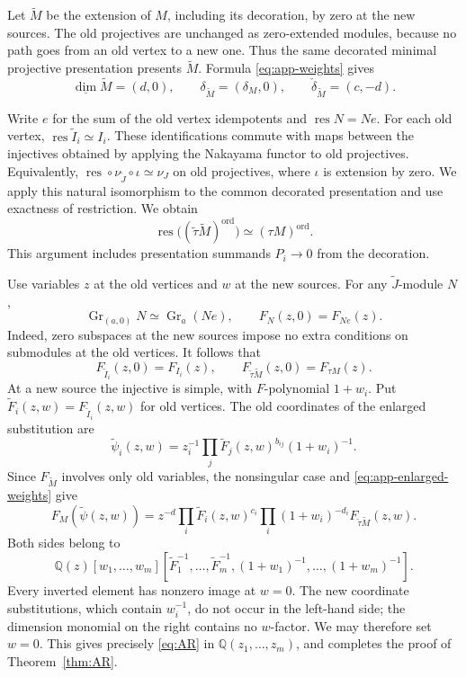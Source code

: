 \documentclass[11pt]{amsart}
\numberwithin{equation}{section}
\theoremstyle{definition}
\theoremstyle{remark}
\newcommand{\op}[1]{\operatorname{#1}}
\newcommand{\Gr}{\op{Gr}}
\newcommand{\QQ}{\mathbb Q}
\newcommand{\dv}{\underline{\dim}}
\newcommand{\res}{\op{res}}
\begin{document}
Let $\widetilde M$ be the extension of $M$, including its
decoration, by zero at the new sources. The old projectives are
unchanged as zero-extended modules, because no path goes from an old
vertex to a new one. Thus the same decorated minimal projective
presentation presents $\widetilde M$. Formula
\eqref{eq:app-weights} gives
\begin{equation}\label{eq:app-enlarged-weights} \dv\widetilde M=(d,0),\qquad \delta_{\widetilde M}=(\delta_M,0),\qquad \check\delta_{\widetilde M}=(c,-d).\end{equation}

Write $e$ for the sum of the old vertex idempotents and
$\res N=Ne$. For each old vertex,
$\res\widetilde I_i\simeq I_i$.
These identifications commute with maps between the injectives obtained
by applying the Nakayama functor to old projectives. Equivalently,
$\res\circ\nu_{\widetilde J}\circ\iota\simeq\nu_J$ on old
projectives, where $\iota$ is extension by zero. We apply this
natural isomorphism to the common decorated presentation and use
exactness of restriction. We obtain
\[ \res\bigl((\widetilde\tau\widetilde M)^{\mathrm{ord}}\bigr)\simeq(\tau M)^{\mathrm{ord}}. \]
This argument includes presentation summands $P_i\to0$ from the decoration.

Use variables $z$ at the old vertices and $w$ at the new sources.
For any $\widetilde J$-module $N$,
\[ \Gr_{(a,0)}N\simeq\Gr_a(Ne),\qquad F_N(z,0)=F_{Ne}(z). \]
Indeed, zero subspaces at the new sources impose no extra conditions
on submodules at the old vertices. It follows that
\[ F_{\widetilde I_i}(z,0)=F_{I_i}(z),\qquad F_{\widetilde\tau\widetilde M}(z,0)=F_{\tau M}(z). \]
At a new source the injective is simple, with $F$-polynomial
$1+w_i$. Put $\widetilde F_i(z,w)=F_{\widetilde I_i}(z,w)$ for old
vertices. The old coordinates of the enlarged substitution are
\[ \widetilde\psi_i(z,w) =z_i^{-1}\prod_j\widetilde F_j(z,w)^{b_{ij}}(1+w_i)^{-1}. \]
Since $F_{\widetilde M}$ involves only old variables, the
nonsingular case and \eqref{eq:app-enlarged-weights} give
\[ F_M(\widetilde\psi(z,w)) =z^{-d}\prod_i\widetilde F_i(z,w)^{c_i} \prod_i(1+w_i)^{-d_i}F_{\widetilde\tau\widetilde M}(z,w). \]
Both sides belong to
\[ \QQ(z)[w_1,\ldots,w_m] [\widetilde F_1^{-1},\ldots,\widetilde F_m^{-1},(1+w_1)^{-1},\ldots,(1+w_m)^{-1}]. \]
Every inverted element has nonzero image at $w=0$. The new
coordinate substitutions, which contain $w_i^{-1}$, do not occur
in the left-hand side; the dimension monomial on the right contains
no $w$-factor. We may therefore set $w=0$. This gives precisely
\eqref{eq:AR} in $\QQ(z_1,\ldots,z_m)$, and completes the proof
of Theorem~\ref{thm:AR}.
\end{document}
